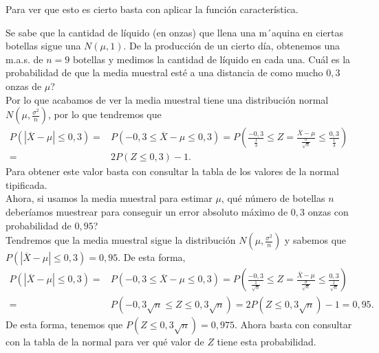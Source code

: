 \begin{observation}
Para ver que esto es cierto basta con aplicar la función característica.
\end{observation}
\begin{eg}
Se sabe que la cantidad de líquido (en onzas) que llena una m´aquina en ciertas botellas sigue una $\displaystyle N\left(\mu, 1\right) $. De la producción de un cierto día, obtenemos una m.a.s. de $\displaystyle n = 9 $ botellas y medimos la cantidad de líquido en cada una. Cuál es la probabilidad de que la media muestral esté a una distancia de como mucho $\displaystyle 0,3 $ onzas de $\displaystyle \mu $?\\

Por lo que acabamos de ver la media muestral tiene una distribución normal $\displaystyle N\left(\mu, \frac{\sigma^{2}}{n}\right) $, por lo que tendremos que 
\[
\begin{split}
	P\left( \left|\overline{X}-\mu\right|\leq 0,3\right) = & P\left(-0,3 \leq \overline{X}-\mu \leq 0,3\right)=P\left(\frac{-0,3}{\frac{1}{3}}\leq Z =\frac{\overline{X}-\mu}{\frac{\sigma }{\sqrt{n}}}\leq \frac{0,3}{\frac{1}{3}}\right)\\
	= & 2P\left(Z \leq 0,3\right)-1.
\end{split}
\]
Para obtener este valor basta con consultar la tabla de los valores de la normal tipificada. \\

Ahora, si usamos la media muestral para estimar $\displaystyle \mu $, qué número de botellas $\displaystyle n $ deberíamos muestrear para conseguir un error absoluto máximo de $\displaystyle 0,3 $ onzas con probabilidad de $\displaystyle 0,95 $? \\

Tendremos que la media muestral sigue la distribución $\displaystyle N\left(\mu, \frac{\sigma ^{2}}{n}\right) $ y sabemos que $\displaystyle P\left( \left|\overline{X}-\mu\right|\leq 0,3\right)=0,95 $. De esta forma,
\[
\begin{split}
	P\left(\left|\overline{X}-\mu\right|\leq 0,3 \right) = & P\left(-0,3 \leq \overline{X}-\mu \leq 0,3\right)=P\left(\frac{-0,3}{\frac{1}{\sqrt{n}}}\leq Z =\frac{\overline{X}-\mu}{\frac{\sigma }{\sqrt{n}}}\leq \frac{0,3}{\frac{1}{\sqrt{n}}}\right) \\
= & P\left(-0,3\sqrt{n}\leq Z \leq 0,3\sqrt{n}\right)=2P\left(Z \leq 0,3\sqrt{n}\right) - 1=0,95 .
\end{split}
\]
De esta forma, tenemos que $\displaystyle P\left(Z \leq 0,3\sqrt{n}\right)=0,975 $. Ahora basta con consultar con la tabla de la normal para ver qué valor de $\displaystyle Z $ tiene esta probabilidad. 
\end{eg}
